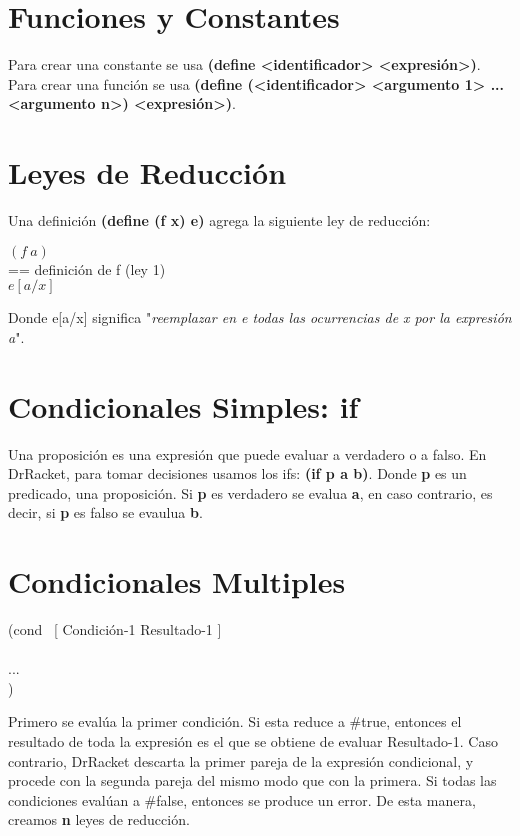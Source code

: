 \documentclass[11pt,a4paper]{article}
\begin{document}
\section{Funciones y Constantes}
Para crear una constante se usa \textbf{(define <identificador> <expresión>)}. Para crear una funci\'on se usa \textbf{(define (<identificador> <argumento 1> ... <argumento n>) <expresión>)}.

\section{Leyes de Reducci\'on}
Una definici\'on \textbf{(define (f x) e)} agrega la siguiente ley de reducci\'on:
\begin{siderules}
$(f\ a)$\\
== definición de f (ley 1)\\
$e[a/x]$
\end{siderules}
Donde e[a/x] significa "\textit{reemplazar en e todas las ocurrencias de x por la expresión a}".

\section{Condicionales Simples: if}
Una proposición es una expresión que puede evaluar a verdadero o a falso. En DrRacket, para tomar decisiones usamos los ifs: \textbf{(if p a b)}. Donde \textbf{p} es un predicado, una proposición. Si \textbf{p} es verdadero se evalua \textbf{a}, en caso contrario, es decir, si \textbf{p} es falso se evaulua \textbf{b}.

\section{Condicionales Multiples}
\begin{siderules}
\noindent (cond  \ [ Condición-1 Resultado-1 ]\\
\indent {}\\
\indent \indent ...\\
\indent {})
\end{siderules}

Primero se evalúa la primer condición. Si esta reduce a \#true, entonces el resultado de toda la expresión es el que se obtiene de evaluar Resultado-1. Caso contrario, DrRacket descarta la primer pareja de la expresión condicional, y procede con la segunda pareja del mismo modo que con la primera. Si todas las condiciones evalúan a \#false, entonces se produce un error. De esta manera, creamos \textbf{n} leyes de reducci\'on.
\end{document}
